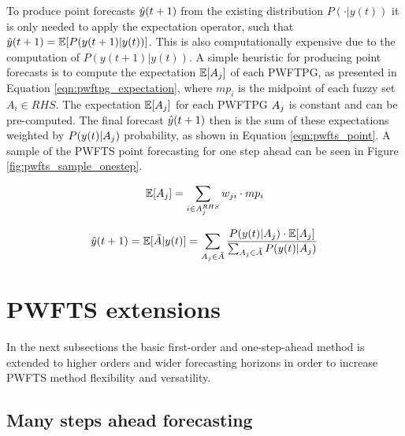 To produce point forecasts $\hat{y}(t+1)$ from the existing distribution $P(\cdot|y(t))$ it is only needed to apply the expectation operator, such that $\hat{y}(t+1) = \mathbb{E}[P(y(t+1)|y(t))]$. This is also computationally expensive due to the computation of $P(y(t+1)|y(t))$. A simple heuristic for producing point forecasts is to compute the expectation $\mathbb{E}[A_j]$ of each PWFTPG, as presented in Equation \eqref{eqn:pwftpg_expectation}, where $mp_i$ is the midpoint of each fuzzy set $A_i \in RHS$. The expectation $\mathbb{E}[A_j]$ for each PWFTPG $A_j$ is constant and can be pre-computed. The final forecast $\hat{y}(t+1)$ then is the sum of these expectations weighted by $P( y(t) | A_j)$ probability, as shown in Equation \eqref{eqn:pwfts_point}. A sample of the PWFTS point forecasting for one step ahead can be seen in Figure \ref{fig:pwfts_sample_onestep}.

\begin{equation}
\mathbb{E}[ A_j ] = \displaystyle \sum_{i \in A_j^{RHS}} w_{ji}\cdot mp_i
\label{eqn:pwftpg_expectation}
\end{equation}

\begin{equation}
\hat{y}(t+1) = \displaystyle \mathbb{E}[ \tilde{A} | y(t) ] =  \sum_{A_j \in \tilde{A}} \frac{ P(y(t) | A_j) \cdot \mathbb{E}[ A_j ]} { \sum_{A_j \in \tilde{A}} P(y(t) | A_j)}
\label{eqn:pwfts_point}
\end{equation}


\section{PWFTS extensions}
\label{sec:pwfts_extensions}

In the next subsections the basic first-order and one-step-ahead method is extended to higher orders and wider forecasting horizons in order to increase PWFTS method flexibility and versatility.

\subsection{Many steps ahead forecasting}
\label{sec:pwfts_many_step}

